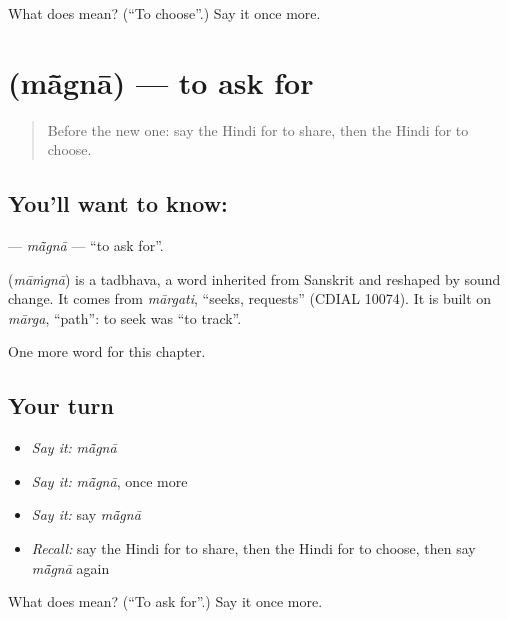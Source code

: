 \begin{tcolorbox}[breakable,colback=teal!4,colframe=teal!35!black,title={Before you move on}]
What does  mean? (\textquotedblleft{}To choose\textquotedblright{}.) Say it once more.
\end{tcolorbox}
\section[\texorpdfstring{\hi{माँगना} (mā̃gnā)}{माँगना (mā̃gnā)}]{ (mā̃gnā) — to ask for}

\label{lesson:HI-C173-magna}



\begin{quote}
Before the new one: say the Hindi for to share, then the Hindi for to choose.
\end{quote}

\subsection*{You'll want to know: }
\textbf{} — \emph{mā̃gnā} — \textquotedblleft{}to ask for\textquotedblright{}.

\begin{cousinweb}
\textbf{} (\emph{māṁgnā}) is a tadbhava, a word inherited from Sanskrit and reshaped by sound change. It comes from \emph{mārgati}, \textquotedblleft{}seeks, requests\textquotedblright{} (CDIAL 10074). It is built on \emph{mārga}, \textquotedblleft{}path\textquotedblright{}: to seek was \textquotedblleft{}to track\textquotedblright{}.
\end{cousinweb}

\begin{grammarlens}[title={What you've built}]
One more word for this chapter.
\end{grammarlens}

\subsection*{Your turn}
\begin{itemize}
\raggedright
  \item \emph{Say it:} \emph{mā̃gnā}
  \item \emph{Say it:} \emph{mā̃gnā}, once more
  \item \emph{Say it:} say \emph{mā̃gnā}
  \item \emph{Recall:} say the Hindi for to share, then the Hindi for to choose, then say \emph{mā̃gnā} again
\end{itemize}

\begin{tcolorbox}[breakable,colback=teal!4,colframe=teal!35!black,title={Before you move on}]
What does  mean? (\textquotedblleft{}To ask for\textquotedblright{}.) Say it once more.
\end{tcolorbox}
